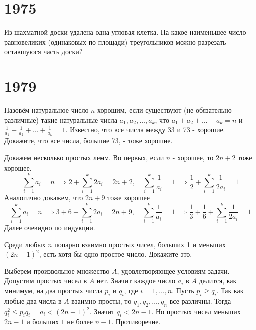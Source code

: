 \documentclass[11pt, a4paper]{template}
\begin{document}
\chapter{1975}

\begin{exercise}[M306]
Из шахматной доски удалена одна угловая клетка. На какое наименьшее число равновеликих (одинаковых по площади) треугольников можно разрезать оставшуюся часть доски?
\end{exercise}

\chapter{1979}

\begin{exercise}[M554]
Назовём натуральное число $n$ хорошим, если существуют (не обязательно различные) такие натуральные числа $a_{1}, a_{2}, \dots, a_{k}$, что $a_{1} + a_{2} + \dots + a_{k} = n$ и $\frac{1}{a_{1}} + \frac{1}{a_{2}} + \dots + \frac{1}{a_{k}} = 1$. Известно, что все числа между 33 и 73 - хорошие. Докажите, что все числа, большие 73, - тоже хорошие.
\end{exercise}

\begin{solution}
Докажем несколько простых лемм. Во первых, если $n$ - хорошее, то $2n + 2$ тоже хорошее. 
$$
\sum_{i = 1}^{k} a_{i} = n \implies 2 + \sum_{i = 1}^{k} 2a_{i} = 2n + 2, \quad \sum_{i = 1}^{k} \frac{1}{a_{i}} = 1 \implies \frac{1}{2} + \sum_{i = 1}^{k} \frac{1}{2a_{i}} = 1
$$
Аналогично докажем, что $2n+9$ тоже хорошее
$$
\sum_{i = 1}^{k} a_{i} = n \implies 3 + 6 + \sum_{i = 1}^{k} 2a_{i} = 2n + 9, \quad \sum_{i = 1}^{k} \frac{1}{a_{i}} = 1 \implies \frac{1}{3} + \frac{1}{6} + \sum_{i = 1}^{k} \frac{1}{2a_{i}} = 1
$$
Далее очевидно по индукции.
\end{solution}

\begin{exercise}[M557]
Среди любых $n$ попарно взаимно простых чисел, больших 1 и меньших $(2n - 1)^{2}$, есть хотя бы одно простое число. Докажите это.
\end{exercise}

\begin{solution}
Выберем произвольное множество $A$, удовлетворяющее условиям задачи. Допустим простых чисел в $A$ нет. Значит каждое число $a_{i}$ в $A$ делится, как минимум, на два простых числа $p_{i}$ и $q_{i}$, где $i = 1, \dots, n$. Пусть $p_{i} \geqslant q_{i}$.  Так как любые два числа в $A$ взаимно просты, то $q_{1}, q_{2}, \dots, q_{n}$ все различны. Тогда $q_{i}^{2} \leqslant p_{i} q_{i} = a_{i} < (2n - 1)^{2}$. Значит $q_{i} < 2n - 1$. Но проcтых чисел меньших $2n - 1$ и больших $1$ не более $n - 1$. Противоречие.
\end{solution}
\end{document}
